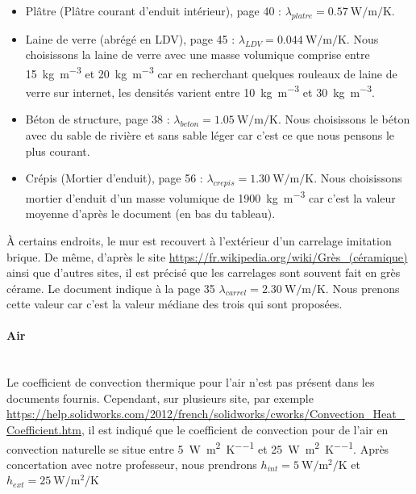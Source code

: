 \documentclass[12pt, a4paper]{article}
\newcommand{\hInt}{\ensuremath{h_{int}}}
\newcommand{\hExt}{\ensuremath{h_{ext}}}
\newcommand{\lambdaPlatre}{\ensuremath{\lambda_{platre}}}
\newcommand{\lambdaLDV}{\ensuremath{\lambda_{LDV}}}
\newcommand{\lambdaBeton}{\ensuremath{\lambda_{beton}}}
\newcommand{\lambdaCrepis}{\ensuremath{\lambda_{crepis}}}
\newcommand{\lambdaCarrel}{\ensuremath{\lambda_{carrel}}}
\begin{document}
\begin{itemize}
\item Plâtre (Plâtre courant d’enduit intérieur), page 40 : $\boxed{\lambdaPlatre = \SI{0.57}{\watt\per\meter\per\kelvin}}$.
\item Laine de verre (abrégé en LDV), page 45 : $\boxed{\lambdaLDV = \SI{0.044}{\watt\per\meter\per\kelvin}}$. Nous choisissons la laine de verre avec une masse volumique comprise entre \SI{15}{\kilo\gram\per\meter\cubed} et \SI{20}{\kilo\gram\per\meter\cubed} car en recherchant quelques rouleaux de laine de verre sur internet,  les densités varient entre \SI{10}{\kilo\gram\per\meter\cubed} et \SI{30}{\kilo\gram\per\meter\cubed}.
\item Béton de structure, page 38 : $\boxed{\lambdaBeton = \SI{1.05}{\watt\per\meter\per\kelvin}}$. Nous choisissons le béton avec du sable de rivière et sans sable léger car c'est ce que nous pensons le plus courant.
\item Crépis (Mortier d'enduit), page 56 : $\boxed{\lambdaCrepis = \SI{1.30}{\watt\per\meter\per\kelvin}}$. Nous choisissons mortier d'enduit d'un masse volumique de \SI{1900}{\kilo\gram\per\meter\cubed} car c'est la valeur moyenne d'après le document (en bas du tableau).
\end{itemize}

\bigskip

À certains endroits, le mur est recouvert à l'extérieur d'un carrelage imitation brique. De même, d'après le site \href{https://fr.wikipedia.org/wiki/Grès_(céramique)}{https://fr.wikipedia.org/wiki/Grès\_(céramique)} ainsi que d'autres sites, il est précisé que les carrelages sont souvent fait en grès cérame. Le document indique à la page 35 $\boxed{\lambdaCarrel = \SI{2.30}{\watt\per\meter\per\kelvin}}$. Nous prenons cette valeur car c'est la valeur médiane des trois qui sont proposées.

\paragraph{Air} \phantom{.} \\

Le coefficient de convection thermique pour l'air n'est pas présent dans les documents fournis. Cependant, sur plusieurs site, par exemple \url{https://help.solidworks.com/2012/french/solidworks/cworks/Convection_Heat_Coefficient.htm}, il est indiqué que le coefficient de convection pour de l'air en convection naturelle se situe entre \SI{5}{\watt\per\meter\squared\per\kelvin} et \SI{25}{\watt\per\meter\squared\per\kelvin}. Après concertation avec notre professeur, nous prendrons $\boxed{\hInt = \SI{5}{\watt\per\meter\squared\per\kelvin} }$ et $\boxed{\hExt = \SI{25}{\watt\per\meter\squared\per\kelvin} }$
\end{document}

